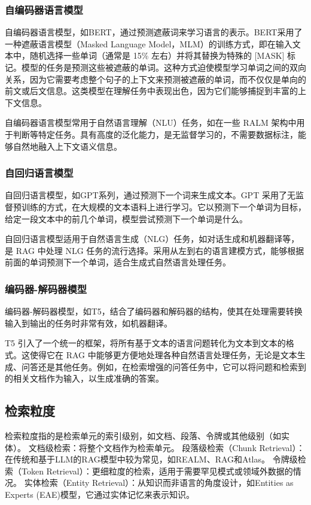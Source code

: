 \subsubsection{自编码器语言模型}
自编码器语言模型，如BERT，通过预测遮蔽词来学习语言的表示。BERT采用了一种遮蔽语言模型（Masked Language Model，MLM）的训练方式，即在输入文本中，随机选择一些单词（通常是 15\% 左右）并将其替换为特殊的 [MASK] 标记。模型的任务是预测这些被遮蔽的单词。这种方式迫使模型学习单词之间的双向关系，因为它需要考虑整个句子的上下文来预测被遮蔽的单词，而不仅仅是单向的前文或后文信息。这类模型在理解任务中表现出色，因为它们能够捕捉到丰富的上下文信息。

自编码器语言模型常用于自然语言理解（NLU）任务，如在一些 RALM 架构中用于判断等特定任务。具有高度的泛化能力，是无监督学习的，不需要数据标注，能够自然地融入上下文语义信息。
\subsubsection{自回归语言模型}
自回归语言模型，如GPT系列，通过预测下一个词来生成文本。GPT 采用了无监督预训练的方式，在大规模的文本语料上进行学习。它以预测下一个单词为目标，给定一段文本中的前几个单词，模型尝试预测下一个单词是什么。

自回归语言模型适用于自然语言生成（NLG）任务，如对话生成和机器翻译等，是 RAG 中处理 NLG 任务的流行选择。采用从左到右的语言建模方式，能够根据前面的单词预测下一个单词，适合生成式自然语言处理任务。
\subsubsection{编码器-解码器模型}
编码器-解码器模型，如T5\cite{raffel2023exploringlimitstransferlearning}，结合了编码器和解码器的结构，使其在处理需要转换输入到输出的任务时非常有效，如机器翻译。

T5 引入了一个统一的框架，将所有基于文本的语言问题转化为文本到文本的格式。这使得它在 RAG 中能够更方便地处理各种自然语言处理任务，无论是文本生成、问答还是其他任务。例如，在检索增强的问答任务中，它可以将问题和检索到的相关文档作为输入，以生成准确的答案。

\subsection{检索粒度}
检索粒度指的是检索单元的索引级别，如文档、段落、令牌或其他级别（如实体）\cite{chen2024densexretrievalretrieval}\cite{lee2021phraseretrievallearnspassage}。
文档级检索：将整个文档作为检索单元。
段落级检索（Chunk Retrieval）：在传统和基于LLM的RAG模型中较为常见，如REALM、RAG和Atlas。
令牌级检索（Token Retrieval）：更细粒度的检索，适用于需要罕见模式或领域外数据的情况。
实体检索（Entity Retrieval）：从知识而非语言的角度设计，如Entities as Experts (EAE)模型，它通过实体记忆来表示知识。
